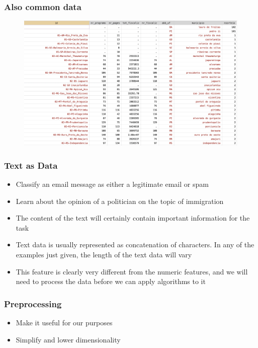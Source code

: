 \documentclass[compress, aspectratio=54]{beamer}
\begin{document}
\begin{frame}
\frametitle{Also common data}
\begin{figure}

\includegraphics[width=0.9\linewidth ]{Figures/text-data2}
\end{figure}
\end{frame}

\begin{frame}
\frametitle{Text as Data}
\begin{itemize}
\item Classify an email message as either a
legitimate email or spam
\item Learn about the opinion of a politician on the topic of
immigration

\item The content of the text will certainly contain important information for the task
\item Text data is usually represented as concatenation of characters. In
any of the examples just given, the length of the text data will vary
\item This feature is clearly very different from the numeric features, and we will need to process the data before we can
apply algorithms to it

\end{itemize}
\end{frame}

\begin{frame}
\frametitle{Preprocessing}
\begin{itemize}
\item Make it useful for our purposes
\item Simplify and lower dimensionality

\end{itemize}
\end{frame}
\end{document}
